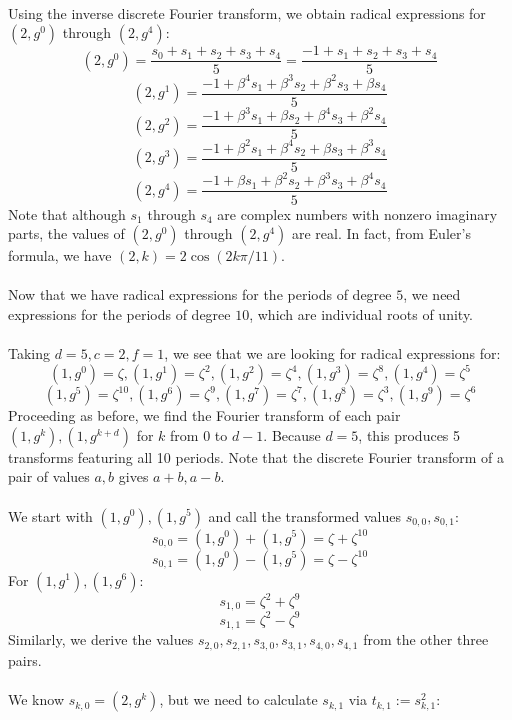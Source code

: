 \documentclass{article}
\begin{document}
        \\
        Using the inverse discrete Fourier transform, we obtain radical expressions for $ (2, g^0) $ through $ (2, g^4) $:
        $$ (2, g^0) = \frac{s_0 + s_1 + s_2 + s_3 + s_4}{5} = \frac{-1 + s_1 + s_2 + s_3 + s_4}{5} $$
        $$ (2, g^1) = \frac{-1 + \beta^4 s_1 + \beta^3 s_2 + \beta^2 s_3 + \beta s_4}{5} $$
        $$ (2, g^2) = \frac{-1 + \beta^3 s_1 + \beta s_2 + \beta^4 s_3 + \beta^2 s_4}{5} $$
        $$ (2, g^3) = \frac{-1 + \beta^2 s_1 + \beta^4 s_2 + \beta s_3 + \beta^3 s_4}{5} $$
        $$ (2, g^4) = \frac{-1 + \beta s_1 + \beta^2 s_2 + \beta^3 s_3 + \beta^4 s_4}{5} $$
        Note that although $ s_1 $ through $ s_4 $ are complex numbers with nonzero imaginary parts, the values of $ (2, g^0) $ through $ (2, g^4) $ are real. In fact, from Euler's formula, we have $ (2, k) = 2 \cos(2k \pi/11) $.\\
        \\
        Now that we have radical expressions for the periods of degree $ 5 $, we need expressions for the periods of degree $ 10 $, which are individual roots of unity.\\
        \\
        Taking $ d = 5, c = 2, f = 1 $, we see that we are looking for radical expressions for:
        $$ (1, g^0) = \zeta, (1, g^1) = \zeta^2, (1, g^2) = \zeta^4, (1, g^3) = \zeta^8, (1, g^4) = \zeta^5 $$
        $$ (1, g^5) = \zeta^{10}, (1, g^6) = \zeta^9, (1, g^7) = \zeta^7, (1, g^8) = \zeta^3, (1, g^9) = \zeta^6 $$
        Proceeding as before, we find the Fourier transform of each pair $ (1, g^k), (1, g^{k + d}) $ for $ k $ from $ 0 $ to $ d - 1 $. Because $ d = 5 $, this produces 5 transforms featuring all 10 periods. Note that the discrete Fourier transform of a pair of values $ a, b $ gives $ a + b, a - b $.\\
        \\
        We start with $ (1, g^0), (1, g^5) $ and call the transformed values $ s_{0, 0}, s_{0, 1} $:
        $$ s_{0, 0} = (1, g^0) + (1, g^5) = \zeta + \zeta^{10} $$
        $$ s_{0, 1} = (1, g^0) - (1, g^5) = \zeta - \zeta^{10} $$
        For $ (1, g^1), (1, g^6) $:
        $$ s_{1, 0} = \zeta^2 + \zeta^9 $$
        $$ s_{1, 1} = \zeta^2 - \zeta^9 $$
        Similarly, we derive the values $ s_{2, 0}, s_{2, 1}, s_{3, 0}, s_{3, 1}, s_{4, 0}, s_{4, 1} $ from the other three pairs.\\
        \\
        We know $ s_{k, 0} = (2, g^k) $, but we need to calculate $ s_{k, 1} $ via $ t_{k, 1} := s_{k, 1}^2 $:
\end{document}
